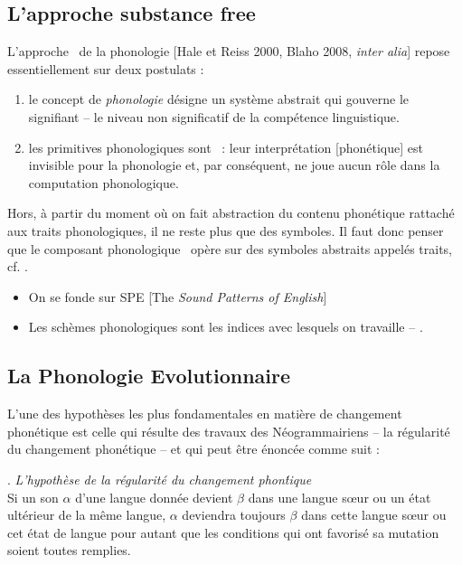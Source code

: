      
    \subsection[L'approche \textit{substance free}]{L'approche substance free}
      L'approche \sfree\ de la phonologie [Hale et Reiss 2000, Blaho 2008, \textit{inter alia}] repose essentiellement sur deux postulats :
	  \begin{enumerate}
	    \item le concept de \textit{phonologie} d\'esigne un syst\`eme abstrait qui gouverne le signifiant -- le niveau non significatif de la comp\'etence linguistique.
	    \item les primitives phonologiques sont \sfree\ : leur interpr\'etation [phon\'etique] est invisible pour la phonologie et, par cons\'equent, ne joue aucun r\^ole dans la computation phonologique. 
	  \end{enumerate}	
	  Hors, \`a partir du moment o\`u on fait abstraction du contenu phon\'etique rattach\'e aux traits phonologiques, il ne reste plus que des symboles. Il faut donc penser que le composant phonologique \lphi\ op\`ere sur des symboles abstraits appel\'es traits, cf. \cite{samuels2009structure}.
	  \begin{prat}
	  	\begin{itemize}
	  		\item On se fonde sur SPE [The \textit{Sound Patterns of English}]
	  		\item Les sch\`emes phonologiques sont les indices avec lesquels on travaille -- .
	  	\end{itemize}
	  \end{prat}	 
	\subsection{La Phonologie Evolutionnaire}
	  L'une des hypoth\`eses les plus fondamentales en mati\`ere de changement phon\'etique est celle qui r\'esulte des travaux des N\'eogrammairiens -- la r\'egularit\'e du changement phon\'etique -- et qui peut \^etre \'enonc\'ee comme suit :
	  
	  \ex. \textit{L'hypoth\`ese de la r\'egularit\'e du changement phon\'tique}\\
	  Si un son $ \alpha $ d'une langue donn\'ee devient $ \beta $ dans une langue s\oe ur ou un \'etat ult\'erieur de la m\^eme langue, $ \alpha $ deviendra toujours $ \beta $ dans cette langue s\oe ur ou cet \'etat de langue pour autant que les conditions qui ont favoris\'e sa mutation soient toutes remplies.

